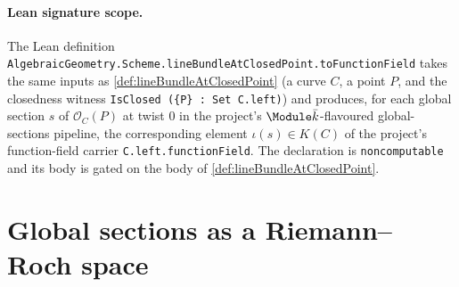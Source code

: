 \begin{definition}
  \paragraph{Lean signature scope.} The Lean definition
  \texttt{AlgebraicGeometry.Scheme.lineBundleAtClosedPoint.toFunctionField}
  takes the same inputs as \cref{def:lineBundleAtClosedPoint} (a curve
  \(C\), a point \(P\), and the closedness witness
  \texttt{IsClosed (\{P\} : Set C.left)}) and produces, for each global
  section \(s\) of \(\mathcal O_C(P)\) at twist \(0\) in the project's
  \(\Module \bar k\)-flavoured global-sections pipeline, the corresponding
  element \(\iota(s) \in K(C)\) of the project's function-field carrier
  \texttt{C.left.functionField}. The declaration is \texttt{noncomputable}
  and its body is gated on the body of
  \cref{def:lineBundleAtClosedPoint}.
\end{definition}

\section{Global sections as a Riemann--Roch space}

